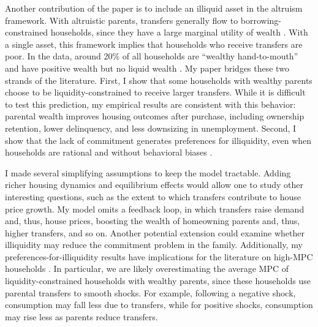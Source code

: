 \documentclass[12pt]{article}
\begin{document}
Another contribution of the paper is to include an illiquid asset in the altruism framework. With altruistic parents, transfers generally flow to borrowing-constrained households, since they have a large marginal utility of wealth \citep{Barczyk2020,Chu2020}. With a single asset, this framework implies that households who receive transfers are poor. In the data, around 20\% of all households are ``wealthy hand-to-mouth'' and have positive wealth but no liquid wealth \citep{Kaplan2014a,Attanasio2018}. My paper bridges these two strands of the literature. First, I show that some households with wealthy parents choose to be liquidity-constrained to receive larger transfers. While it is difficult to test this prediction, my empirical results are consistent with this behavior: parental wealth improves housing outcomes after purchase, including ownership retention, lower delinquency, and less downsizing in unemployment. Second, I show that the lack of commitment generates preferences for illiquidity, even when households are rational and without behavioral biases \citep[see e.g.,][]{attanasio2024temptation}. 

I made several simplifying assumptions to keep the model tractable. Adding richer housing dynamics and equilibrium effects would allow one to study other interesting questions, such as the extent to which transfers contribute to house price growth. My model omits a feedback loop, in which transfers raise demand and, thus, house prices, boosting the wealth of homeowning parents and, thus, higher transfers, and so on. Another potential extension could examine whether illiquidity may reduce the commitment problem in the family. Additionally, my preferences-for-illiquidity results have implications for the literature on high-MPC households \citep[see e.g.,][]{kaplan2022marginal}. In particular, we are likely overestimating the average MPC of liquidity-constrained households with wealthy parents, since these households use parental transfers to smooth shocks. For example, following a negative shock, consumption may fall less due to transfers, while for positive shocks, consumption may rise less as parents reduce transfers.

\newpage
\begingroup\singlespacing


\endgroup
\newpage


\appendix

\setcounter{figure}{0}
\renewcommand{\thefigure}{A\arabic{figure}}
\setcounter{table}{0}
\renewcommand{\thetable}{A\arabic{table}}
\end{document}
